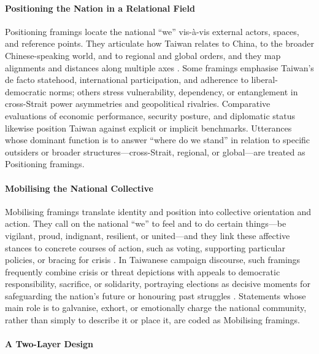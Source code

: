\documentclass[man,12pt]{apa7}
\begin{document}
\paragraph{Positioning the Nation in a Relational Field}

Positioning framings locate the national ``we'' vis-à-vis external actors, spaces, and reference points. 
They articulate how Taiwan relates to China, to the broader Chinese-speaking world, and to regional and global orders, and they map alignments and distances along multiple axes \parencite{cabestan2005,decleen2017}. 
Some framings emphasise Taiwan's de facto statehood, international participation, and adherence to liberal-democratic norms; others stress vulnerability, dependency, or entanglement in cross-Strait power asymmetries and geopolitical rivalries. 
Comparative evaluations of economic performance, security posture, and diplomatic status likewise position Taiwan against explicit or implicit benchmarks. 
Utterances whose dominant function is to answer ``where do we stand'' in relation to specific outsiders or broader structures—cross-Strait, regional, or global—are treated as Positioning framings.\\%
\paragraph{Mobilising the National Collective}

Mobilising framings translate identity and position into collective orientation and action. 
They call on the national ``we'' to feel and to do certain things—be vigilant, proud, indignant, resilient, or united—and they link these affective stances to concrete courses of action, such as voting, supporting particular policies, or bracing for crisis \parencite{benford2000}. 
In Taiwanese campaign discourse, such framings frequently combine crisis or threat depictions with appeals to democratic responsibility, sacrifice, or solidarity, portraying elections as decisive moments for safeguarding the nation's future or honouring past struggles \parencite{aleman2018,hur2020}. 
Statements whose main role is to galvanise, exhort, or emotionally charge the national community, rather than simply to describe it or place it, are coded as Mobilising framings.\\%
\paragraph{A Two-Layer Design}
\end{document}
